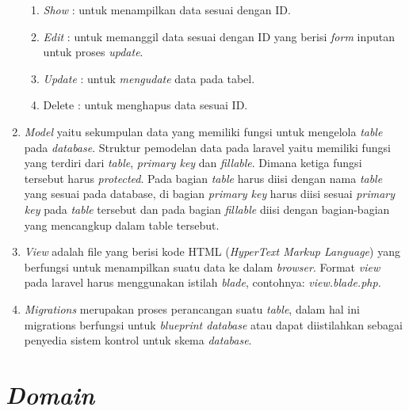 \begin{enumerate}
\begin{enumerate}
\item \textit{Show}	\hspace{0.35cm}: untuk menampilkan data sesuai dengan ID.

\item \textit{Edit}	\hspace{0.57cm}: untuk memanggil data sesuai dengan ID yang berisi \textit{form} inputan untuk proses \textit{update}.

\item \textit{Update} \hspace{0.08cm}: untuk \textit{mengudate} data pada tabel.

\item Delete \hspace{0.18cm}: untuk menghapus data sesuai ID.
\end{enumerate}

\item \textit{Model} yaitu sekumpulan data yang memiliki fungsi untuk mengelola \textit{table} pada \textit{database}. Struktur pemodelan data pada laravel yaitu memiliki fungsi yang terdiri dari \textit{table}, \textit{primary key} dan \textit{fillable}. Dimana ketiga fungsi tersebut harus \textit{protected}. Pada bagian \textit{table} harus diisi dengan nama \textit{table} yang sesuai pada database, di bagian \textit{primary key} harus diisi sesuai \textit{primary key} pada \textit{table} tersebut dan pada bagian \textit{fillable} diisi dengan bagian-bagian yang mencangkup dalam table tersebut.

\item \textit{View} adalah file yang berisi kode HTML (\textit{HyperText Markup Language}) yang berfungsi untuk menampilkan suatu data ke dalam \textit{browser}. Format \textit{view} pada laravel harus menggunakan istilah \textit{blade}, contohnya: \textit{view.blade.php.
}
\item \textit{Migrations} merupakan proses perancangan suatu \textit{table}, dalam hal ini migrations berfungsi untuk \textit{blueprint database} atau dapat diistilahkan sebagai penyedia sistem kontrol untuk skema \textit{database}. 

\end{enumerate}

\section{\textit{Domain}}

